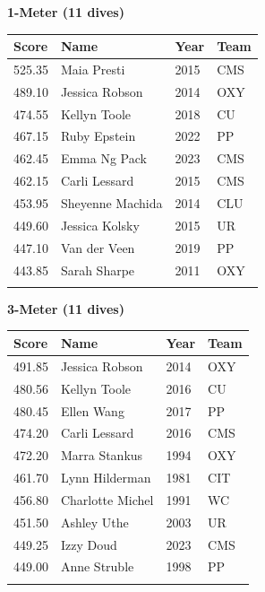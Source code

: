 \vspace{1.2em}
\noindent\begin{minipage}[t]{0.98\textwidth}
\centering
\textbf{\textcolor{teamprimary}{1-Meter (11 dives)}}\par
\vspace{0.5em}
\centering
\small
\renewcommand{\arraystretch}{1.0}
\setlength{\tabcolsep}{4pt}
\begin{tabular}{@{}p{2.5cm}p{4.5cm}p{1.5cm}p{2.5cm}@{}}
\toprule
\textbf{Score} & \textbf{Name} & \textbf{Year} & \textbf{Team} \\
\midrule
525.35 & Maia Presti & 2015 & CMS \\
489.10 & Jessica Robson & 2014 & OXY \\
474.55 & Kellyn Toole & 2018 & CU \\
467.15 & Ruby Epstein & 2022 & PP \\
462.45 & Emma Ng Pack & 2023 & CMS \\
462.15 & Carli Lessard & 2015 & CMS \\
453.95 & Sheyenne Machida & 2014 & CLU \\
449.60 & Jessica Kolsky & 2015 & UR \\
447.10 & Van der Veen & 2019 & PP \\
443.85 & Sarah Sharpe & 2011 & OXY \\
\bottomrule
\vspace{0.5em}
\end{tabular}
\end{minipage}
\vspace{1.2em}
\noindent\begin{minipage}[t]{0.98\textwidth}
\centering
\textbf{\textcolor{teamprimary}{3-Meter (11 dives)}}\par
\vspace{0.5em}
\centering
\small
\renewcommand{\arraystretch}{1.0}
\setlength{\tabcolsep}{4pt}
\begin{tabular}{@{}p{2.5cm}p{4.5cm}p{1.5cm}p{2.5cm}@{}}
\toprule
\textbf{Score} & \textbf{Name} & \textbf{Year} & \textbf{Team} \\
\midrule
491.85 & Jessica Robson & 2014 & OXY \\
480.56 & Kellyn Toole & 2016 & CU \\
480.45 & Ellen Wang & 2017 & PP \\
474.20 & Carli Lessard & 2016 & CMS \\
472.20 & Marra Stankus & 1994 & OXY \\
461.70 & Lynn Hilderman & 1981 & CIT \\
456.80 & Charlotte Michel & 1991 & WC \\
451.50 & Ashley Uthe & 2003 & UR \\
449.25 & Izzy Doud & 2023 & CMS \\
449.00 & Anne Struble & 1998 & PP \\
\bottomrule
\vspace{0.5em}
\end{tabular}
\end{minipage}
\clearpage
